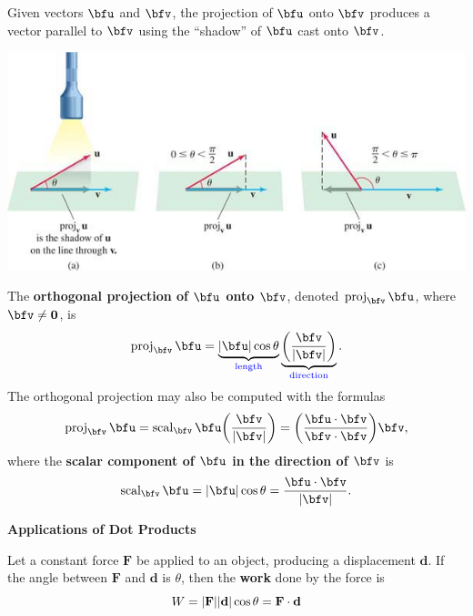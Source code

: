 \documentclass[mathNotesPreamble]{subfiles}
\begin{document}
  \noindent
  Given vectors $\bfu$ and $\bfv$, the projection of $\bfu$ onto $\bfv$ produces a vector parallel to $\bfv$ using the ``shadow'' of $\bfu$ cast onto $\bfv$.
  \begin{center}
    \includegraphics[width=0.9\linewidth]{images/briggs_13_03/fig13_47}
  \end{center}
  \begin{defn*}
    The \textbf{orthogonal projection of $\bfu$ onto $\bfv$}, denoted $\proj_\bfv \bfu$, where $\bfv\neq\bfO$, is
      \[\proj_\bfv \bfu =\underbrace{\abs{\bfu}\cos\theta}_{\textnormal{\textcolor{blue}{length}}}\underbrace{\parens{\frac{\bfv}{\abs{\bfv}}}}_{\textnormal{\textcolor{blue}{direction}}}.\]
    The orthogonal projection may also be computed with the formulas
      \[\proj_\bfv \bfu=\operatorname{scal}_\bfv \bfu\parens{\frac{\bfv}{\abs{\bfv}}}=\parens{\frac{\bfu\cdot\bfv}{\bfv\cdot\bfv}}\bfv,\]
    where the \textbf{scalar component of $\bfu$ in the direction of $\bfv$} is
      \[\operatorname{scal}_\bfv \bfu=\abs{\bfu}\cos\theta=\frac{\bfu\cdot\bfv}{\abs{\bfv}}.\]
  \end{defn*}
  \pagebreak
  \textbf{Applications of Dot Products}

  \begin{defn*}[Work]
    Let a constant force $\mathbf{F}$ be applied to an object, producing a displacement $\mathbf{d}$. If the angle between $\mathbf{F}$ and $\mathbf{d}$ is $\theta$, then the \textbf{work} done by the force is
      \[W={\left\vert\mathbf{F}\right\vert}{\left\vert\mathbf{d}\right\vert}\cos\theta=\mathbf{F}\cdot \mathbf{d}\]
  \end{defn*}
  \begin{ex*}
    
  \end{ex*}
  
\end{document}
